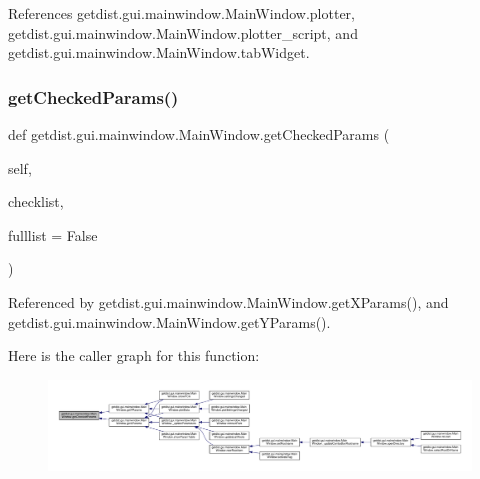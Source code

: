 References getdist.\+gui.\+mainwindow.\+Main\+Window.\+plotter, getdist.\+gui.\+mainwindow.\+Main\+Window.\+plotter\+\_\+script, and getdist.\+gui.\+mainwindow.\+Main\+Window.\+tab\+Widget.

\mbox{\label{classgetdist_1_1gui_1_1mainwindow_1_1MainWindow_a6a538cbf9dfa41511637abcdabad7f23}} 
\subsubsection{\texorpdfstring{get\+Checked\+Params()}{getCheckedParams()}}
{\footnotesize\ttfamily def getdist.\+gui.\+mainwindow.\+Main\+Window.\+get\+Checked\+Params (\begin{DoxyParamCaption}\item[{}]{self,  }\item[{}]{checklist,  }\item[{}]{fulllist = {\ttfamily False} }\end{DoxyParamCaption})}



Referenced by getdist.\+gui.\+mainwindow.\+Main\+Window.\+get\+X\+Params(), and getdist.\+gui.\+mainwindow.\+Main\+Window.\+get\+Y\+Params().

Here is the caller graph for this function\+:
\nopagebreak
\begin{figure}[H]
\begin{center}
\leavevmode
\includegraphics[width=350pt]{classgetdist_1_1gui_1_1mainwindow_1_1MainWindow_a6a538cbf9dfa41511637abcdabad7f23_icgraph}
\end{center}
\end{figure}
\mbox{\label{classgetdist_1_1gui_1_1mainwindow_1_1MainWindow_aa0388a3f86e2f94a313715182b9cc2ac}} 
